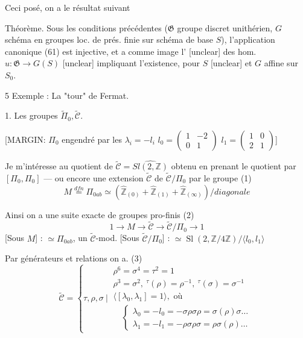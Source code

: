 Ceci posé, on a le résultat suivant

Théorème. Sous les conditions précédentes ($\mathfrak{G}$ groupe discret unithérien, $G$ schéma en groupes loc. de prés. finie sur schéma de base $S$), l'application canonique (61) est injective, et a comme image l' [unclear] des hom. $u : \mathfrak{G} \to G(S)$ [unclear] impliquant l'existence, pour $S$ [unclear] et $G$ affine sur $S_0$.

\newpage


5 Exemple : La "tour" de Fermat.

1. Les groupes $\tilde{\Pi}_0, \tilde{\mathcal{C}}$.

[MARGIN: $\Pi_0$ engendré par les $\lambda_i = -l_i$ 
$l_0 = \begin{pmatrix} 1 & -2 \\ 0 & 1 \end{pmatrix}$ 
$l_1 = \begin{pmatrix} 1 & 0 \\ 2 & 1 \end{pmatrix}$]

Je m'intéresse au quotient de $\tilde{\mathcal{C}} = \widehat{Sl(2,\mathbb{Z})}$
obtenu en prenant le quotient par
$[\Pi_0, \Pi_0]$ — ou encore une extension
$\tilde{\mathcal{C}}$ de $\tilde{\mathcal{C}}/\Pi_0$ par le groupe
(1) $$M \overset{dfn}{=} \Pi_{0 ab} \simeq \left( \hat{\mathbb{Z}}_{(0)} + \hat{\mathbb{Z}}_{(1)} + \hat{\mathbb{Z}}_{(\infty)} \right) / diagonale$$

Ainsi on a une suite exacte de groupes
pro-finis
(2) $$1 \longrightarrow M \longrightarrow \tilde{\mathcal{C}} \longrightarrow \tilde{\mathcal{C}}/\Pi_0 \longrightarrow 1$$
[Sous $M$] : $\simeq \Pi_{0 ab}$, un $\tilde{\mathcal{C}}$-mod.
[Sous $\tilde{\mathcal{C}}/\Pi_0$] : $\simeq \operatorname{Sl}(2, \mathbb{Z}/4\mathbb{Z}) / \langle l_0, l_1 \rangle$

Par générateurs et relations on a.
(3) $$\tilde{\mathcal{C}} = \left\{ \tau, \rho, \sigma \ \Bigg| \ \begin{array}{l} \rho^6 = \sigma^4 = \tau^2 = 1 \\ \rho^3 = \sigma^2, \ ^\tau(\rho) = \rho^{-1}, \ ^\tau(\sigma) = \sigma^{-1} \\ \langle [\lambda_0, \lambda_1] = 1 \rangle, \text{ où} \\ \quad \begin{cases} \lambda_0 = -l_0 = - \sigma \rho \sigma \rho = \sigma (\rho) \sigma \dots \\ \lambda_1 = -l_1 = - \rho \sigma \rho \sigma = \rho \sigma (\rho) \dots \end{cases} \end{array} \right.$$

